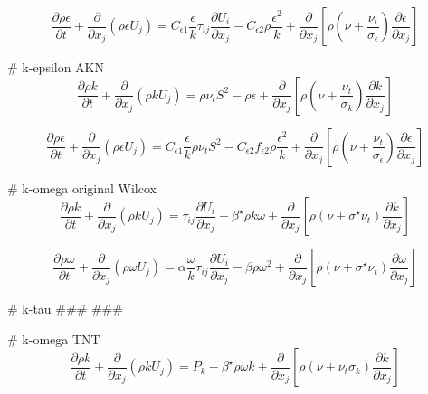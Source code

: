\begin{equation}
\frac{\partial \rho\epsilon}{\partial t} + \frac{\partial}{\partial x_j} \left(\rho\epsilon U_j \right) = C_{\epsilon1}\frac{\epsilon}{k}\tau_{ij}\frac{\partial U_i}{\partial x_j} - C_{\epsilon2}\rho\frac{\epsilon^2}{k} + \frac{\partial}{\partial x_j}\left[\rho\left(\nu + \frac{\nu_t}{\sigma_{\epsilon}}\right)\frac{\partial \epsilon}{\partial x_j} \right]
\end{equation}

# k-epsilon AKN
\begin{equation}
\frac{\partial \rho k}{\partial t} + \frac{\partial}{\partial x_j} \left(\rho k U_j \right) = \rho\nu_t S^2 - \rho\epsilon + \frac{\partial }{\partial x_j} \left[ \rho\left(\nu + \frac{\nu_t}{\sigma_k} \right) \frac{\partial k}{\partial x_j} \right]
\end{equation}

\begin{equation}
\frac{\partial \rho\epsilon}{\partial t} + \frac{\partial}{\partial x_j} \left(\rho\epsilon U_j \right) = C_{\epsilon1} \frac{\epsilon}{k} \rho\nu_t S^2 - C_{\epsilon2}f_{\epsilon2}\rho\frac{\epsilon^2}{k} + \frac{\partial }{\partial x_j}  \left[  \rho\left(\nu + \frac{\nu_t}{\sigma_\epsilon} \right) \frac{\partial \epsilon}{\partial x_j} \right]
\end{equation}

# k-omega original Wilcox
\begin{equation}
\frac{\partial \rho k}{\partial t} + \frac{\partial}{\partial x_j} \left(\rho k U_j \right) = \tau_{ij}\frac{\partial U_i}{\partial x_j} - \beta^{\star} \rho k \omega + \frac{\partial}{\partial x_j}\left[ \rho\left(\nu + \sigma^{\star} \nu_t\right)\frac{\partial k}{\partial x_j}\right]
\end{equation}

\begin{equation}
\frac{\partial \rho \omega}{\partial t} + \frac{\partial}{\partial x_j} \left(\rho \omega U_j \right) = \alpha \frac{\omega}{k}\tau_{ij}\frac{\partial U_i}{\partial x_j} - \beta \rho\omega^2 + \frac{\partial}{\partial x_j}\left[ \rho\left(\nu + \sigma^{\star} \nu_t\right)\frac{\partial \omega}{\partial x_j}\right]
\end{equation}

# k-tau
###
###

# k-omega TNT
\begin{equation}
\frac{\partial \rho k}{\partial t} + \frac{\partial}{\partial x_j} \left(\rho k U_j \right) = P_k - \beta^{\star}\rho\omega k + \frac{\partial }{\partial x_j}  \left[  \rho\left(\nu + \nu_t\sigma_k \right) \frac{\partial k}{\partial x_j} \right]
\end{equation}


